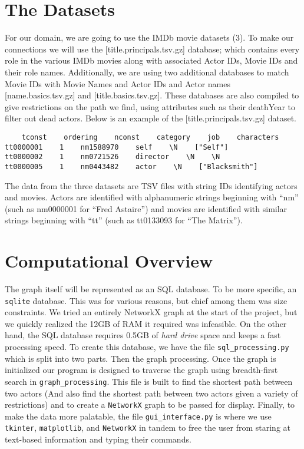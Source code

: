 \documentclass{article}
\begin{document}
\section{The Datasets}
For our domain, we are going to use the IMDb movie datasets (3). To make our connections we will use the [title.principals.tsv.gz] database; which contains every role in the various IMDb movies along with associated Actor IDs, Movie IDs and their role names. Additionally, we are using two additional databases to match Movie IDs with Movie Names and Actor IDs and Actor names [name.basics.tsv.gz] and [title.basics.tsv.gz]. These databases are also compiled to give restrictions on the path we find, using attributes such as their deathYear to filter out dead actors. Below is an example of the [title.principals.tsv.gz] dataset.
\begin{verbatim}
    tconst    ordering    nconst    category    job    characters
tt0000001    1    nm1588970    self    \N    ["Self"]
tt0000002    1    nm0721526    director    \N    \N
tt0000005    1    nm0443482    actor    \N    ["Blacksmith"]
\end{verbatim}
The data from the three datasets are TSV files with string IDs identifying actors and movies. Actors are identified with alphanumeric strings beginning with ``nm” (such as nm0000001 for ``Fred Astaire”) and movies are identified with similar strings beginning with ``tt” (such as tt0133093 for ``The Matrix”). 

\section{Computational Overview}
The graph itself will be represented as an SQL database. To be more specific, an \verb+sqlite+ database. This was for various reasons, but chief among them was size constraints. We tried an entirely NetworkX graph at the start of the project, but we quickly realized the 12GB of RAM it required was infeasible. On the other hand, the SQL database requires 0.5GB of \emph{hard drive} space and keeps a fast processing speed. To create this database, we have the file \verb+sql_processing.py+ which is split into two parts. Then the graph processing. Once the graph is initialized our program is designed to traverse the graph using breadth-first search in \verb+graph_processing+. This file is built to find the shortest path between two actors (And also find the shortest path between two actors given a variety of restrictions) and to create a \verb+NetworkX+ graph to be passed for display. Finally, to make the data more palatable, the file \verb+gui_interface.py+ is where we use \verb+tkinter+, \verb+matplotlib+, and \verb+NetworkX+ in tandem to free the user from staring at text-based information and typing their commands.
\end{document}
